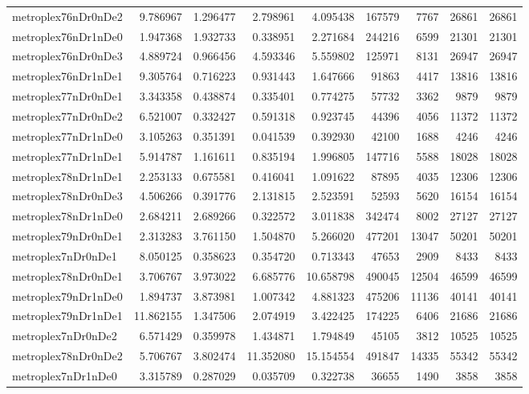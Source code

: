 \begin{longtable}{|l|r|r|r|r|r|r|r|r|}
metroplex76nDr0nDe2 & 9.786967 & 1.296477 & 2.798961 & 4.095438 & 167579 & 7767 & 26861 & 26861 \\
metroplex76nDr1nDe0 & 1.947368 & 1.932733 & 0.338951 & 2.271684 & 244216 & 6599 & 21301 & 21301 \\
metroplex76nDr0nDe3 & 4.889724 & 0.966456 & 4.593346 & 5.559802 & 125971 & 8131 & 26947 & 26947 \\
metroplex76nDr1nDe1 & 9.305764 & 0.716223 & 0.931443 & 1.647666 & 91863 & 4417 & 13816 & 13816 \\
metroplex77nDr0nDe1 & 3.343358 & 0.438874 & 0.335401 & 0.774275 & 57732 & 3362 & 9879 & 9879 \\
metroplex77nDr0nDe2 & 6.521007 & 0.332427 & 0.591318 & 0.923745 & 44396 & 4056 & 11372 & 11372 \\
metroplex77nDr1nDe0 & 3.105263 & 0.351391 & 0.041539 & 0.392930 & 42100 & 1688 & 4246 & 4246 \\
metroplex77nDr1nDe1 & 5.914787 & 1.161611 & 0.835194 & 1.996805 & 147716 & 5588 & 18028 & 18028 \\
metroplex78nDr1nDe1 & 2.253133 & 0.675581 & 0.416041 & 1.091622 & 87895 & 4035 & 12306 & 12306 \\
metroplex78nDr0nDe3 & 4.506266 & 0.391776 & 2.131815 & 2.523591 & 52593 & 5620 & 16154 & 16154 \\
metroplex78nDr1nDe0 & 2.684211 & 2.689266 & 0.322572 & 3.011838 & 342474 & 8002 & 27127 & 27127 \\
metroplex79nDr0nDe1 & 2.313283 & 3.761150 & 1.504870 & 5.266020 & 477201 & 13047 & 50201 & 50201 \\
metroplex7nDr0nDe1 & 8.050125 & 0.358623 & 0.354720 & 0.713343 & 47653 & 2909 & 8433 & 8433 \\
metroplex78nDr0nDe1 & 3.706767 & 3.973022 & 6.685776 & 10.658798 & 490045 & 12504 & 46599 & 46599 \\
metroplex79nDr1nDe0 & 1.894737 & 3.873981 & 1.007342 & 4.881323 & 475206 & 11136 & 40141 & 40141 \\
metroplex79nDr1nDe1 & 11.862155 & 1.347506 & 2.074919 & 3.422425 & 174225 & 6406 & 21686 & 21686 \\
metroplex7nDr0nDe2 & 6.571429 & 0.359978 & 1.434871 & 1.794849 & 45105 & 3812 & 10525 & 10525 \\
metroplex78nDr0nDe2 & 5.706767 & 3.802474 & 11.352080 & 15.154554 & 491847 & 14335 & 55342 & 55342 \\
metroplex7nDr1nDe0 & 3.315789 & 0.287029 & 0.035709 & 0.322738 & 36655 & 1490 & 3858 & 3858 \\

\end{longtable}
